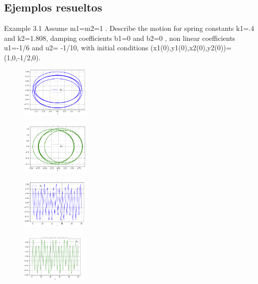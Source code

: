 \documentclass[a4paper]{article}
\begin{document}
\subsection{Ejemplos resueltos}

Example 3.1 Assume m1=m2=1 . Describe the motion for spring constants k1=.4 and k2=1.808, damping coefficients b1=0 and b2=0 , non linear coefficients u1=-1/6 and u2= -1/10,   with   initial   conditions (x1(0),y1(0),x2(0),y2(0))=(1,0,-1/2,0).

\begin{figure}[ht!]
\centering
\includegraphics[width=0.3\textwidth]{311.png}
\end{figure}

\begin{figure}[ht!]
\centering
\includegraphics[width=0.3\textwidth]{312.png}
\end{figure}

\begin{figure}[ht!]
\centering
\includegraphics[width=0.3\textwidth]{313.png}
\end{figure}

\begin{figure}[ht!]
\centering
\includegraphics[width=0.3\textwidth]{314.png}
\end{figure}
\end{document}
